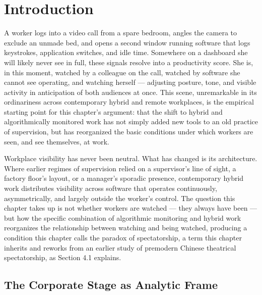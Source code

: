 \documentclass[10pt]{article}
\begin{document}
\section{Introduction}

A worker logs into a video call from a spare bedroom, angles the camera to exclude an unmade bed, and opens a second window running software that logs keystrokes, application switches, and idle time. Somewhere on a dashboard she will likely never see in full, these signals resolve into a productivity score. She is, in this moment, watched by a colleague on the call, watched by software she cannot see operating, and watching herself --- adjusting posture, tone, and visible activity in anticipation of both audiences at once. This scene, unremarkable in its ordinariness across contemporary hybrid and remote workplaces, is the empirical starting point for this chapter's argument: that the shift to hybrid and algorithmically monitored work has not simply added new tools to an old practice of supervision, but has reorganized the basic conditions under which workers are seen, and see themselves, at work.

Workplace visibility has never been neutral. What has changed is its architecture. Where earlier regimes of supervision relied on a supervisor's line of sight, a factory floor's layout, or a manager's sporadic presence, contemporary hybrid work distributes visibility across software that operates continuously, asymmetrically, and largely outside the worker's control. The question this chapter takes up is not whether workers are watched --- they always have been --- but how the specific combination of algorithmic monitoring and hybrid work reorganizes the relationship between watching and being watched, producing a condition this chapter calls the paradox of spectatorship, a term this chapter inherits and reworks from an earlier study of premodern Chinese theatrical spectatorship, as Section 4.1 explains.

\subsection{The Corporate Stage as Analytic Frame}
\end{document}
